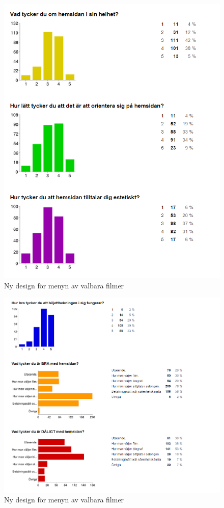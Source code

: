\documentclass[swedish,a4paper,11pt]{article}
\begin{document}
\begin{figure}[H]
\centering
\includegraphics[scale=0.8]{shart2.PNG} 
\caption{Ny design för menyn av valbara filmer}
\end{figure}

\begin{figure}[H]
\centering
\includegraphics[scale=0.8]{shart3.PNG} 
\caption{Ny design för menyn av valbara filmer}
\end{figure}
\end{document}
